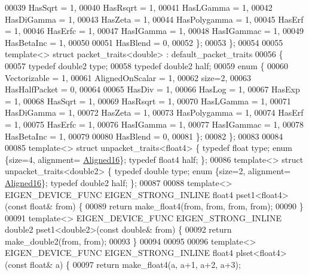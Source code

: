 \begin{DoxyCode}
00039     HasSqrt = 1,
00040     HasRsqrt = 1,
00041     HasLGamma = 1,
00042     HasDiGamma = 1,
00043     HasZeta = 1,
00044     HasPolygamma = 1,
00045     HasErf = 1,
00046     HasErfc = 1,
00047     HasIGamma = 1,
00048     HasIGammac = 1,
00049     HasBetaInc = 1,
00050 
00051     HasBlend = 0,
00052   \};
00053 \};
00054 
00055 \textcolor{keyword}{template}<> \textcolor{keyword}{struct }packet\_traits<double> : default\_packet\_traits
00056 \{
00057   \textcolor{keyword}{typedef} double2 type;
00058   \textcolor{keyword}{typedef} double2 half;
00059   \textcolor{keyword}{enum} \{
00060     Vectorizable = 1,
00061     AlignedOnScalar = 1,
00062     size=2,
00063     HasHalfPacket = 0,
00064 
00065     HasDiv  = 1,
00066     HasLog  = 1,
00067     HasExp  = 1,
00068     HasSqrt = 1,
00069     HasRsqrt = 1,
00070     HasLGamma = 1,
00071     HasDiGamma = 1,
00072     HasZeta = 1,
00073     HasPolygamma = 1,
00074     HasErf = 1,
00075     HasErfc = 1,
00076     HasIGamma = 1,
00077     HasIGammac = 1,
00078     HasBetaInc = 1,
00079 
00080     HasBlend = 0,
00081   \};
00082 \};
00083 
00084 
00085 \textcolor{keyword}{template}<> \textcolor{keyword}{struct }unpacket\_traits<float4>  \{ \textcolor{keyword}{typedef} \textcolor{keywordtype}{float}  type; \textcolor{keyword}{enum} \{size=4, alignment=
      \hyperlink{group__enums_gga45fe06e29902b7a2773de05ba27b47a1af8e2bf74b04c02199f62c5e3c06dbfcc}{Aligned16}\}; \textcolor{keyword}{typedef} float4 half; \};
00086 \textcolor{keyword}{template}<> \textcolor{keyword}{struct }unpacket\_traits<double2> \{ \textcolor{keyword}{typedef} \textcolor{keywordtype}{double} type; \textcolor{keyword}{enum} \{size=2, alignment=
      \hyperlink{group__enums_gga45fe06e29902b7a2773de05ba27b47a1af8e2bf74b04c02199f62c5e3c06dbfcc}{Aligned16}\}; \textcolor{keyword}{typedef} double2 half; \};
00087 
00088 \textcolor{keyword}{template}<> EIGEN\_DEVICE\_FUNC EIGEN\_STRONG\_INLINE float4 pset1<float4>(\textcolor{keyword}{const} \textcolor{keywordtype}{float}&  from) \{
00089   \textcolor{keywordflow}{return} make\_float4(from, from, from, from);
00090 \}
00091 \textcolor{keyword}{template}<> EIGEN\_DEVICE\_FUNC EIGEN\_STRONG\_INLINE double2 pset1<double2>(\textcolor{keyword}{const} \textcolor{keywordtype}{double}& from) \{
00092   \textcolor{keywordflow}{return} make\_double2(from, from);
00093 \}
00094 
00095 
00096 \textcolor{keyword}{template}<> EIGEN\_DEVICE\_FUNC EIGEN\_STRONG\_INLINE float4 plset<float4>(\textcolor{keyword}{const} \textcolor{keywordtype}{float}& a) \{
00097   \textcolor{keywordflow}{return} make\_float4(a, a+1, a+2, a+3);

\end{DoxyCode}
